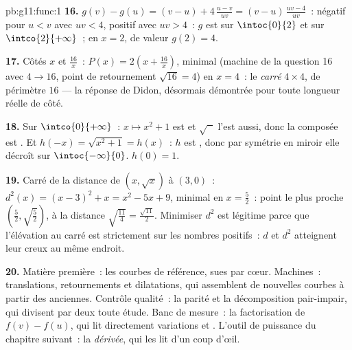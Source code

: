 \begin{solution}{pb:g11:func:1}
\textbf{16.} $g(v) - g(u) = (v - u) + 4\,\frac{u - v}{uv}
= (v - u)\,\frac{uv - 4}{uv}$~: négatif pour $u < v$ avec
$uv < 4$, positif avec $uv > 4$~: $g$ est  sur
$\intoc{0}{2}$ et  sur $\intco{2}{+\infty}$~;  en
$x = 2$, de valeur $g(2) = 4$.

\textbf{17.} Côtés $x$ et $\frac{16}{x}$~:
$P(x) = 2\left(x + \frac{16}{x}\right)$, minimal (machine de la
question 16 avec $4 \to 16$, point de retournement $\sqrt{16} = 4$)
en $x = 4$~: le \emph{carré} $4 \times 4$, de périmètre $16$ --- la
réponse de Didon, désormais démontrée pour toute longueur réelle de
côté.

\textbf{18.} Sur $\intco{0}{+\infty}$~: $x \mapsto x^2 + 1$ est
 et $\sqrt{\phantom{x}}$ l'est aussi, donc la composée est
. Et $h(-x) = \sqrt{x^2 + 1} = h(x)$~: $h$ est , donc
par symétrie en miroir elle décroît sur $\intoc{-\infty}{0}$.
 $h(0) = 1$.

\textbf{19.} Carré de la distance de $(x, \sqrt x)$ à $(3, 0)$~:
$d^2(x) = (x - 3)^2 + x = x^2 - 5x + 9$, minimal en
$x = \frac52$~: point le plus proche
$\left(\frac52, \sqrt{\frac52}\right)$, à la distance
$\sqrt{\frac{11}{4}} = \frac{\sqrt{11}}{2}$. Minimiser $d^2$ est
légitime parce que l'élévation au carré est strictement 
sur les nombres positifs~: $d$ et $d^2$ atteignent leur creux au même
endroit.

\textbf{20.} Matière première~: les courbes de référence, sues par
cœur. Machines~: translations, retournements et dilatations, qui
assemblent de nouvelles courbes à partir des anciennes. Contrôle
qualité~: la parité et la décomposition pair-impair, qui divisent par
deux toute étude. Banc de mesure~: la factorisation de
$f(v) - f(u)$, qui lit directement variations et . L'outil
de puissance du chapitre suivant~: la \emph{dérivée}, qui les lit
d'un coup d'œil.
\end{solution}

